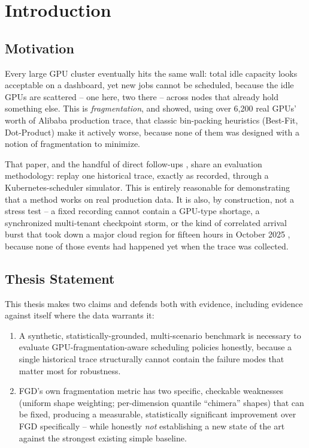 \documentclass[12pt]{report}
\begin{document}
\tableofcontents
\listoffigures
\listoftables

\newpage
{}

\chapter{Introduction}

\section{Motivation}
Every large GPU cluster eventually hits the same wall: total idle
capacity looks acceptable on a dashboard, yet new jobs cannot be
scheduled, because the idle GPUs are scattered -- one here, two there --
across nodes that already hold something else. This is
\emph{fragmentation}, and \citet{fgd2023} showed, using over 6,200 real
GPUs' worth of Alibaba production trace, that classic bin-packing
heuristics (Best-Fit, Dot-Product) make it actively worse, because none
of them was designed with a notion of fragmentation to minimize.

That paper, and the handful of direct follow-ups
\citep{pwr2024,cafgd2025}, share an evaluation methodology: replay one
historical trace, exactly as recorded, through a Kubernetes-scheduler
simulator. This is entirely reasonable for demonstrating that a method
works on real production data. It is also, by construction, not a stress
test -- a fixed recording cannot contain a GPU-type shortage, a
synchronized multi-tenant checkpoint storm, or the kind of correlated
arrival burst that took down a major cloud region for fifteen hours in
October 2025 \citep{awsoutage2025}, because none of those events had
happened yet when the trace was collected.

\section{Thesis Statement}
This thesis makes two claims and defends both with evidence, including
evidence against itself where the data warrants it:

\begin{enumerate}[leftmargin=1.4em]
  \item A synthetic, statistically-grounded, multi-scenario benchmark is
    necessary to evaluate GPU-fragmentation-aware scheduling policies
    honestly, because a single historical trace structurally cannot
    contain the failure modes that matter most for robustness.
  \item FGD's own fragmentation metric has two specific, checkable
    weaknesses (uniform shape weighting; per-dimension quantile
    ``chimera'' shapes) that can be fixed, producing a measurable,
    statistically significant improvement over FGD specifically --
    while honestly \emph{not} establishing a new state of the art
    against the strongest existing simple baseline.
\end{enumerate}
\end{document}
